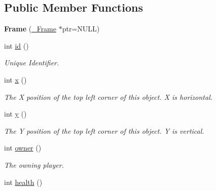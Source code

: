 \subsection*{Public Member Functions}
\begin{DoxyCompactItemize}
\item 
\hypertarget{classFrame_a769fdb84cf592ffcd4237c19ceef6d82}{
{\bfseries Frame} (\hyperlink{struct__Frame}{\_\-Frame} $\ast$ptr=NULL)}
\label{classFrame_a769fdb84cf592ffcd4237c19ceef6d82}

\item 
\hypertarget{classFrame_a911baca571e6b2797abdf8571c052a33}{
int \hyperlink{classFrame_a911baca571e6b2797abdf8571c052a33}{id} ()}
\label{classFrame_a911baca571e6b2797abdf8571c052a33}

\begin{DoxyCompactList}\small\item\em Unique Identifier. \item\end{DoxyCompactList}\item 
\hypertarget{classFrame_ae79da2230ddbd26db054c1813c90001d}{
int \hyperlink{classFrame_ae79da2230ddbd26db054c1813c90001d}{x} ()}
\label{classFrame_ae79da2230ddbd26db054c1813c90001d}

\begin{DoxyCompactList}\small\item\em The X position of the top left corner of this object. X is horizontal. \item\end{DoxyCompactList}\item 
\hypertarget{classFrame_a68e7df1ea11dc4f395af738236497703}{
int \hyperlink{classFrame_a68e7df1ea11dc4f395af738236497703}{y} ()}
\label{classFrame_a68e7df1ea11dc4f395af738236497703}

\begin{DoxyCompactList}\small\item\em The Y position of the top left corner of this object. Y is vertical. \item\end{DoxyCompactList}\item 
\hypertarget{classFrame_a7d59291410b16536acb04d17eb2c7f78}{
int \hyperlink{classFrame_a7d59291410b16536acb04d17eb2c7f78}{owner} ()}
\label{classFrame_a7d59291410b16536acb04d17eb2c7f78}

\begin{DoxyCompactList}\small\item\em The owning player. \item\end{DoxyCompactList}\item 
\hypertarget{classFrame_aaf3de4533499648a8d698289969259a2}{
int \hyperlink{classFrame_aaf3de4533499648a8d698289969259a2}{health} ()}
\label{classFrame_aaf3de4533499648a8d698289969259a2}


\end{DoxyCompactItemize}
